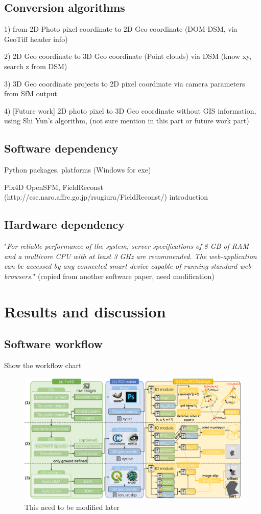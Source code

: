 \documentclass{configs/bmcart}
\begin{document}
\subsection*{Conversion algorithms}
1) from 2D Photo pixel coordinate to 2D Geo coordinate (DOM DSM, via GeoTiff header info)

2) 2D Geo coordinate to 3D Geo coordinate (Point clouds) via DSM (know xy, search z from DSM)

3) 3D Geo coordinate projects to 2D pixel coordinate via camera parameters from SfM output

4) [Future work] 2D photo pixel to 3D Geo coordinate without GIS information, using Shi Yun's algorithm, (not sure mention in this part or future work part)

\subsection*{Software dependency}
Python packages, platforms (Windows for exe)

Pix4D OpenSFM, FieldReconst (http://cse.naro.affrc.go.jp/rsugiura/FieldReconst/) introduction

\subsection*{Hardware dependency}
"\textit{For reliable performance of the system, server specifications of 8 GB of RAM and a multicore CPU with at least 3 GHz are recommended. The web-application can be accessed by any connected smart device capable of
running standard web-browsers.}" (copied from another software paper, need modification)

\section*{Results and discussion}

\subsection*{Software workflow}
Show the workflow chart 

\begin{figure}[htbp]
\includegraphics[width=0.95\linewidth]{figures/workflow.pdf}
\caption{
  This need to be modified later}
\end{figure}
\end{document}
